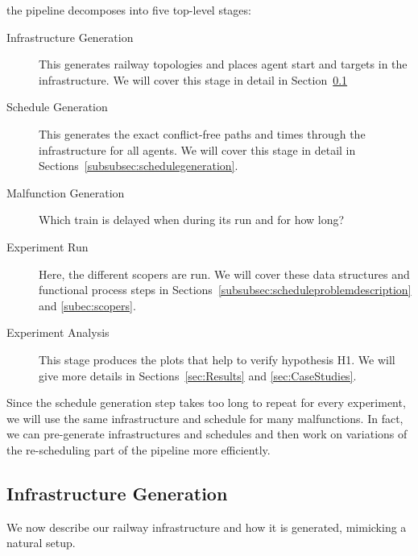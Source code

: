 \documentclass{article}
\begin{document}
%
the pipeline decomposes into five top-level stages:
\begin{description}
\item[Infrastructure Generation] This generates railway topologies and places agent start and targets in the infrastructure. We will cover this stage in detail in Section~\ref{subsubsec:infrastructuregeneration}
\item[Schedule Generation] This generates the exact conflict-free paths and times through the infrastructure for all agents. We will cover this stage in detail in Sections~\ref{subsubsec:schedulegeneration}. 
\item[Malfunction Generation] Which train is delayed when during its run and for how long?
\item[Experiment Run] Here, the different scopers are run. We will cover these data structures and functional process steps in Sections~\ref{subsubsec:scheduleproblemdescription} and \ref{subec:scopers}.
\item[Experiment Analysis] This stage produces the plots that help to verify hypothesis H1. We will give more details in Sections~\ref{sec:Results} and \ref{sec:CaseStudies}.
\end{description}
Since the schedule generation step takes too long to repeat for every experiment, we will use the same infrastructure and schedule for many malfunctions. In fact, we can pre-generate infrastructures and schedules and then work on variations of the re-scheduling part of the pipeline more efficiently.



\subsection{Infrastructure Generation}\label{subsubsec:infrastructuregeneration}

We now describe our railway infrastructure and how it is generated, mimicking a natural setup. 
\end{document}
